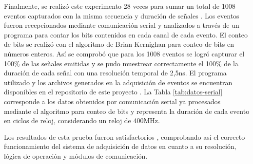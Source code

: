 	Finalmente, se realizó este experimento 28 veces para sumar un total de 1008 eventos capturados con la misma secuencia y duración de señales . Los eventos fueron recepcionados mediante comunicación serial y analizados a través de un programa para contar los bits contenidos en cada canal de cada evento. El conteo de bits se realizó con el algoritmo de Brian Kernighan\cite{SinghCountC++} para conteo de bits en números enteros. Así se comprobó que para los 1008 eventos se logró capturar el 100\% de las señales emitidas y se pudo muestrear correctamente el 100\% de la duración de cada señal con una resolución temporal de 2,5ns. El programa utilizado y los archivos generados en la adquisición de eventos se encuentran disponibles en el repositorio de este proyecto \cite{GonzalezMuonRepository}. La Tabla \ref{tab:datos-serial} corresponde a los datos obtenidos por comunicación serial ya procesados mediante el algoritmo para conteo de bits y representa la duración de cada evento en ciclos de reloj, considerando un reloj de 400MHz.	
	
	Los resultados de esta prueba fueron satisfactorios , comprobando así el correcto funcionamiento del sistema de adquisición de datos en cuanto a su resolución, lógica de operación y módulos de comunicación.
	
